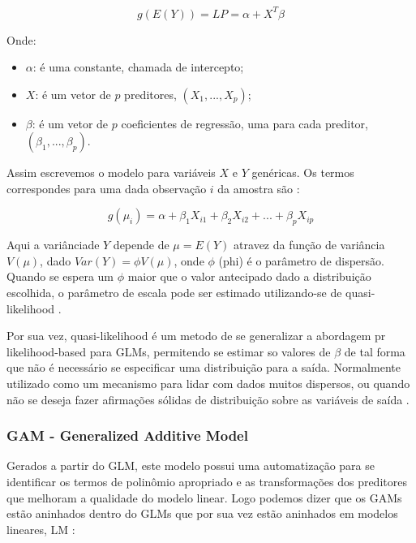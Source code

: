 \documentclass[
    12pt,               %
    openright,          %
    oneside,            %
    a4paper,            %
    english,            %
    brazil              %
    ]{abntex2}
\begin{document}
\begin{equation}
    \label{GLM_general_eq}
    g(E(Y)) = LP = \alpha + X^T \beta
\end{equation}

Onde:
\begin{itemize}
    \item $\alpha$: é uma constante, chamada de intercepto;
    \item $X$: é um vetor de $p$ preditores, $(X_1, ..., X_p)$;
    \item $\beta$: é um vetor de $p$ coeficientes de regressão, uma para cada preditor, $(\beta_1, ..., \beta_p)$.
\end{itemize}

Assim escrevemos o modelo para variáveis $X$ e $Y$ genéricas. Os termos correspondes para uma dada observação $i$ da 
amostra são \cite{GAMeGLM_especie_estudo}:

\begin{equation}
    \label{GLM_observ_eq}
    g(\mu_i) = \alpha + \beta_1X_{i1} + \beta_2X_{i2} + ... + \beta_pX_{ip}
\end{equation}

Aqui a variânciade $Y$ depende de $\mu = E(Y)$ atravez da função de variância $V(\mu)$, dado $Var(Y) = \phi V(\mu)$, onde $\phi$ (phi)
é o parâmetro de dispersão. Quando se espera um $\phi$ maior que o valor antecipado dado a distribuição escolhida, o parâmetro de
escala pode ser estimado utilizando-se de quasi-likelihood \cite{GAMeGLM_especie_estudo}.

Por sua vez, quasi-likelihood é um metodo de se generalizar a abordagem pr likelihood-based para GLMs, permitendo se estimar so valores
de $\beta$ de tal forma que não é necessário se especificar uma distribuição para a saída. Normalmente utilizado como um mecanismo
para lidar com dados muitos dispersos, ou quando não se deseja fazer afirmações sólidas de distribuição sobre as variáveis de saída 
\cite{quase-likehood}.

\subsubsection{GAM - Generalized Additive Model}

Gerados a partir do GLM, este modelo possui uma automatização para se identificar os termos de polinômio apropriado
e as transformações dos preditores que melhoram a qualidade do modelo linear. Logo podemos dizer que os GAMs estão
aninhados dentro do GLMs que por sua vez estão aninhados em modelos lineares, LM \cite{GAMeGLM_especie_estudo}:
\end{document}

